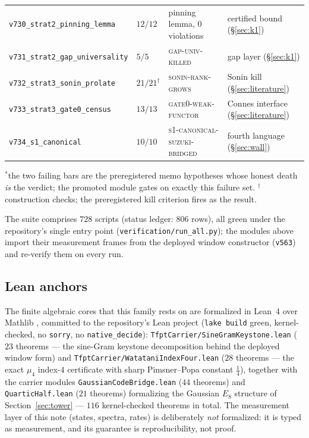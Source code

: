 \documentclass[11pt,a4paper]{article}
\theoremstyle{remark}
\begin{document}
\begin{center}
\begin{tabular}{@{}llll@{}}
\texttt{v730\_strat2\_pinning\_lemma} & $12/12$ &
pinning lemma, $0$ violations & certified bound (\S\ref{sec:k1})\\
\texttt{v731\_strat2\_gap\_universality} & $5/5$ &
\textsc{gap-univ-killed} & gap layer (\S\ref{sec:k1})\\
\texttt{v732\_strat3\_sonin\_prolate} & $21/21^{\dagger}$ &
\textsc{sonin-rank-grows} & Sonin kill (\S\ref{sec:literature})\\
\texttt{v733\_strat3\_gate0\_census} & $13/13$ &
\textsc{gate0-weak-functor} & Connes interface (\S\ref{sec:literature})\\
\texttt{v734\_s1\_canonical} & $10/10$ &
\textsc{s1-canonical-suzuki-bridged} & fourth language (\S\ref{sec:wall})\\
\bottomrule
\end{tabular}
\end{center}
{\footnotesize $^{\ast}$the two failing bars are the preregistered
memo hypotheses whose honest death \emph{is} the verdict; the
promoted module gates on exactly this failure set.
$^{\dagger}$construction checks; the preregistered kill criterion
fires as the result.}

The suite comprises $728$ scripts (status ledger: $806$ rows), all
green under the repository's single entry point
(\texttt{verification/run\_all.py}); the modules above import their
measurement frames from the deployed window constructor
(\texttt{v563}) and re-verify them on every run.

\subsection{Lean anchors}
The finite algebraic cores that this family rests on are formalized
in Lean~4 over Mathlib \cite{Moura21,mathlib}, committed to the
repository's Lean project (\texttt{lake build} green, kernel-checked,
no \texttt{sorry}, no \texttt{native\_decide}):
\texttt{TfptCarrier/SineGramKeystone.lean} ($23$ theorems --- the
sine-Gram keystone decomposition behind the deployed window form)
and \texttt{TfptCarrier/WatataniIndexFour.lean} ($28$ theorems ---
the exact $\mu_4$ index-$4$ certificate with sharp Pimsner--Popa
constant $\tfrac14$), together with the carrier modules
\texttt{GaussianCodeBridge.lean} ($44$ theorems) and
\texttt{QuarticHalf.lean} ($21$ theorems) formalizing the Gaussian
$E_8$ structure of Section~\ref{sec:tower} --- $116$ kernel-checked
theorems in total.  The measurement layer of this note (states,
spectra, rates) is deliberately \emph{not} formalized: it is typed as
measurement, and its guarantee is reproducibility, not proof.
\end{document}
